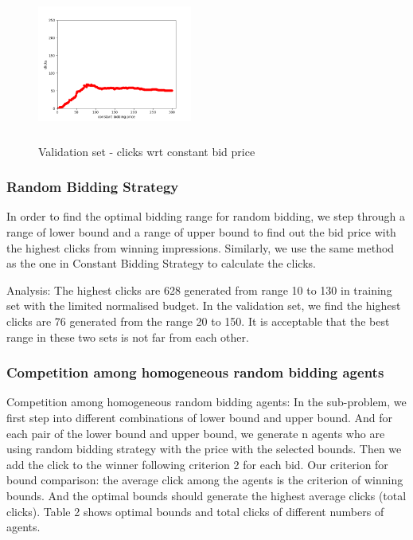 \documentclass{sig-alternate-05-2015}
\begin{document}
\begin{figure}
\centering
\includegraphics[height=2in, width=2in]{images/constant_bidding_validation.png}
\caption{Validation set - clicks wrt constant bid price}
\end{figure}




\subsubsection{Random Bidding Strategy}
In order to find the optimal bidding range for random bidding, we step through a range of lower bound and a range of upper bound to find out the bid price with the highest clicks from winning impressions. Similarly, we use the same method as the one in Constant Bidding Strategy to calculate the clicks.

Analysis:
The highest clicks are 628 generated from range 10 to 130 in training set with the limited normalised budget. In the validation set, we find the highest clicks are 76 generated from the range 20 to 150. It is acceptable that the best range in these two sets is not far from each other.


\subsubsection{Competition among homogeneous random bidding agents}

Competition among homogeneous random bidding agents:
In the sub-problem, we first step into different combinations of lower bound and upper bound. And for each pair of the lower bound and upper bound, we generate n agents who are using random bidding strategy with the price with the selected bounds. Then we add the click to the winner following criterion 2 for each bid.
Our criterion for bound comparison: the average click among the agents is the criterion of winning bounds. And the optimal bounds should generate the highest average clicks (total clicks). Table 2 shows optimal bounds and total clicks of different numbers of agents.
\end{document}
